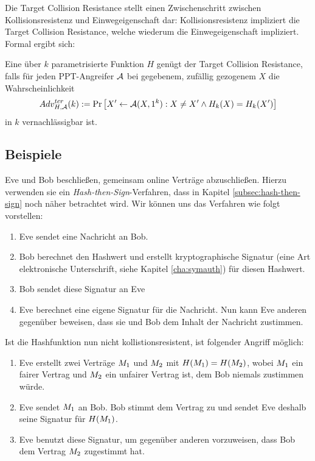Die Target Collision Resistance stellt einen Zwischenschritt zwischen
Kollisionsresistenz und Einwegeigenschaft dar: Kollisionsresistenz
impliziert die Target Collision Resistance, welche wiederum die
Einwegeigenschaft impliziert. Formal ergibt sich:

\begin{definition}
Eine über $k$ parametrisierte Funktion $H$ genügt der Target Collision
Resistance\indexTargetCollisionResistance, falls für jeden PPT-Angreifer
$\mathcal{A}$ bei gegebenem, zufällig gezogenem $X$ die Wahrscheinlichkeit
\begin{equation*}
Adv^{tcr}_{H,\mathcal{A}}(k):= \Pr \left[ X' \leftarrow \mathcal{A}(X, 1^k) : X \neq X'
  \land H_k(X) = H_k(X')\right] 
\end{equation*}
in $k$ vernachlässigbar ist.
\end{definition}
\subsection{Beispiele}

\begin{beispiel}\indexCollisionResistance
Eve und Bob beschließen, gemeinsam online Verträge abzuschließen. Hierzu
verwenden sie ein \textit{Hash-then-Sign}-Verfahren, dass in Kapitel
\ref{subsec:hash-then-sign} noch näher betrachtet wird. Wir können uns
das Verfahren wie 
folgt vorstellen: 
\begin{enumerate}
\item Eve sendet eine Nachricht an Bob.
\item Bob berechnet den Hashwert und erstellt kryptographische
  Signatur (eine Art \glqq elektronische Unterschrift\grqq, siehe
  Kapitel \ref{cha:symauth}) für diesen Hashwert.
\item Bob sendet diese Signatur an Eve
\item Eve berechnet eine eigene Signatur für die Nachricht. Nun kann Eve
  anderen gegenüber beweisen, dass sie und Bob dem Inhalt der Nachricht
  zustimmen. 
\end{enumerate}
Ist die Hashfunktion nun nicht kollistionsresistent, ist folgender
Angriff möglich:
\begin{enumerate}
\item Eve erstellt zwei Verträge $M_1$ und $M_2$ mit
  $H(M_1) = H(M_2)$, wobei
  $M_1$ ein fairer Vertrag und $M_2$ ein unfairer Vertrag
  ist, dem Bob niemals zustimmen würde.
\item Eve sendet $M_1$ an Bob. Bob stimmt dem Vertrag zu und
  sendet Eve deshalb seine Signatur für $H(M_1)$.
\item Eve benutzt diese Signatur, um gegenüber anderen vorzuweisen, dass
  Bob dem Vertrag $M_2$ zugestimmt hat.
\end{enumerate}
\end{beispiel}

